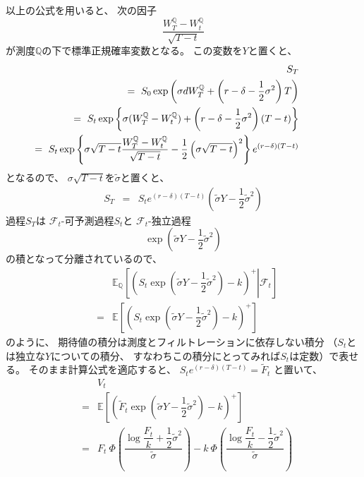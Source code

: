 \documentclass[uplatex,a4j,12pt,dvipdfmx]{jsarticle}
\begin{document}
以上の公式を用いると、
次の因子
$$
	\dfrac{W^{\mathbb{Q}}_{T} - W^{\mathbb{Q}}_{t}}{\sqrt{T-t}}
$$
が測度$\mathbb{Q}$の下で標準正規確率変数となる。
この変数を$Y$と置くと、
%
%
\begin{eqnarray*}
	&&
	S_{T}
	\\ && \hspace{-15mm} = \
	S_{0}
	\exp
	\left(
	\sigma d W^{\mathbb{Q}}_{T}
	+
	\left(
	r
	- \delta
	- \dfrac{1}{2} \sigma^{2}
	\right)
	T
	\right)
	\\ && \hspace{-15mm} = \
	S_{t}
	\exp
	\left\{
	\sigma ( W^{\mathbb{Q}}_{T} - W^{\mathbb{Q}}_{t} )
	+
	\left(
	r
	- \delta
	- \dfrac{1}{2} \sigma^{2}
	\right)
	(T-t)
	\right\}
	\\ && \hspace{-15mm} = \
	S_{t}
	\exp
	\left\{
	\sigma \sqrt{T-t}
	\dfrac{ W^{\mathbb{Q}}_{T} - W^{\mathbb{Q}}_{t} }
	{\sqrt{T-t}}
	-
	\dfrac{1}{2}
	\left( \sigma \sqrt{T-t} \right)^{2}
	\right\}
	e^{(r - \delta )(T-t)}
\end{eqnarray*}
%
%
となるので、
$\sigma \sqrt{T-t}$を$\tilde{\sigma}$と置くと、
%
%
\begin{eqnarray*}
	S_{T}
	&=&
	S_{t}
	e^{(r - \delta )(T-t)}
	\left(
	\tilde{\sigma} Y
	-
	\dfrac{1}{2}
	\tilde{\sigma}^{2}
	\right)
\end{eqnarray*}
%
%
過程$S_{T}$は
$\mathcal{F}_{t}$-可予測過程$S_{t}$と
$\mathcal{F}_{t}$-独立過程
$$
	\exp
	\left(
	\tilde{\sigma} Y
	-
	\dfrac{1}{2}
	\tilde{\sigma}^{2}
	\right)
$$
の積となって分離されているので、
%
%
\begin{eqnarray*}
	&&
	\mathbb{E}_{\mathbb{Q}} \left[ \left. \left(
		S_{t}
		\exp
		\left(
		\tilde{\sigma} Y
		-
		\dfrac{1}{2}
		\tilde{\sigma}^{2}
		\right)
		-k
		\right)^{+} \right| \mathcal{F}_{t} \right]
	\\ &=&
	\mathbb{E} \left[ \left(
		S_{t}
		\exp
		\left(
		\tilde{\sigma} Y
		-
		\dfrac{1}{2}
		\tilde{\sigma}^{2}
		\right)
		-k
		\right)^{+} \right]
\end{eqnarray*}
%
%
のように、
期待値の積分は測度とフィルトレーションに依存しない積分
（$S_{t}$とは独立な$Y$についての積分、
すなわちこの積分にとってみれば$S_{t}$は定数）で表せる。
そのまま計算公式を適応すると、
$S_{t} e^{(r - \delta)(T-t)}=\tilde{F}_{t}$
と置いて、
%
%
\begin{eqnarray*}
	&&
	V_{t}
	\\ &=&
	\mathbb{E} \left[ \left(
		\tilde{F}_{t}
		\exp
		\left(
		\tilde{\sigma} Y
		-
		\dfrac{1}{2}
		\tilde{\sigma}^{2}
		\right)
		-k
		\right)^{+} \right]
	\\ &=&
	F_{t}
	\ \! \Phi
	\left(
	\dfrac{
		\log \dfrac{F_{t}}{k} + \dfrac{1}{2} \tilde{\sigma}^{2}
	}
	{\tilde{\sigma}}
	\right)
	-
	k
	\ \! \Phi
	\left(
	\dfrac{
		\log \dfrac{F_{t}}{k} - \dfrac{1}{2} \tilde{\sigma}^{2}
	}
	{\tilde{\sigma}}
	\right)
\end{eqnarray*}
%
%
\end{document}

